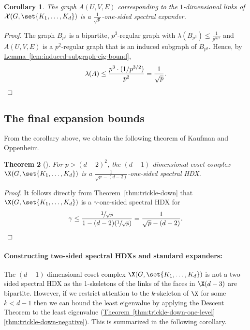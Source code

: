 \documentclass[11pt]{article}
\newcommand{\expref}[2]{\texorpdfstring{\hyperref[#2]{#1~\ref{#2}}}{#1~\ref{#2}}}
\newtheorem{theorem}{Theorem}[section]
\newtheorem{corollary}[theorem]{Corollary}
\begin{document}
\begin{corollary}
  The graph $A(U,V,E)$ corresponding to the $1$-dimensional links of $\mathcal{X}(G,\set{K_1,\ldots, K_d})$ is a $\frac{1}{\sqrt{p}}$-one-sided spectral expander. 
\end{corollary}
\begin{proof}
  The graph $B_{p^3}$ is a bipartite, $p^3$-regular graph with $\lambda(B_{p^3}) \leq \frac{1}{p^{3/2}}$ and $A(U,V,E)$ is a $p^2$-regular graph that is an induced subgraph of $B_{p^3}$. Hence, by \expref{Lemma}{lem:induced-subgraph-eig-bound},
  \[
\lambda(A) \leq \frac{p^3 \cdot (1/p^{3/2})}{p^2} = \frac{1}{\sqrt{p}}. \qedhere
  \]
\end{proof}

\subsection*{The final expansion bounds}

From the corollary above, we obtain the following theorem of Kaufman and 
Oppenheim.

\begin{theorem}[\cite{KaufmanO2018}]\label{thm:KO-HDX} For $p > (d-2)^2$, 
  the $(d-1)$-dimensional coset complex $\X(G,\set{K_1,\ldots,K_d})$
  is a $\frac1{\sqrt{p}-(d-2)}$-one-sided spectral HDX.
\end{theorem}

\begin{proof}
%
It follows  %
directly from \expref{Theorem}{thm:trickle-down} that
  $\X(G,\set{K_1,\ldots,K_d})$ is a $\gamma$-one-sided spectral HDX for
  \[
  \gamma \leq \frac{\sfrac{1}{\sqrt{p}}}{1 - (d-2)(\sfrac{1}{\sqrt{p}})} = \frac{1}{\sqrt{p} - (d-2)}.\qedhere
  \]
\end{proof}

\paragraph{Constructing two-sided spectral HDXs and standard expanders:}

The $(d-1)$-dimensional coset complex $\X(G,\set{K_1,\ldots,K_d})$ is
not a two-sided spectral HDX as the 1-skeletons of the links of the faces in
$\X(d-3)$ are bipartite. However, if we restrict attention to the $k$-skeleton of
$\X$ for some $k<d-1$ then we can bound the least eigenvalue
%
by applying the Descent Theorem to the least eigenvalue %
(\expref{Theorem}{thm:trickle-down-one-level}\eqref{thm:trickle-down-negative}).
This is summarized in the following corollary. 
\end{document}

